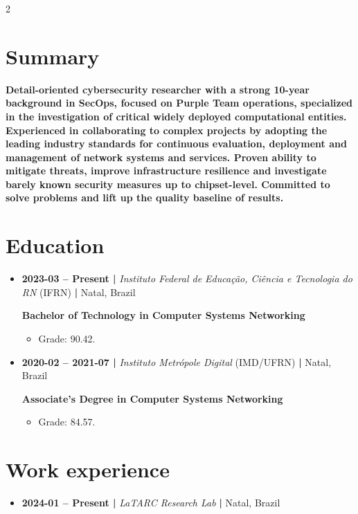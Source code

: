 \documentclass[a4paper,10pt]{article}
\begin{document}
\setlength{\columnsep}{6.35mm}
\setlength{\columnseprule}{1pt}
\def\columnseprulecolor{\color{x-acs-dark-red}}
\begin{multicols*}{2}
\section*{\textbf{Summary}}
\label{sec:orga3d499d}
\textbf{Detail-oriented cybersecurity researcher with a strong 10-year background in
SecOps, focused on Purple Team operations, specialized in the investigation of
critical widely deployed computational entities. Experienced in collaborating to
complex projects by adopting the leading industry standards for continuous
evaluation, deployment and management of network systems and services. Proven
ability to mitigate threats, improve infrastructure resilience and investigate
barely known security measures up to chipset-level. Committed to solve problems
and lift up the quality baseline of results.}
\section*{Education}
\label{sec:org8a8e533}
\begin{itemize}
\item \textbf{2023-03 -- Present |} \emph{Instituto Federal de Educação, Ciência e Tecnologia do
RN} (IFRN) \textbf{|} Natal, Brazil

\textbf{Bachelor of Technology in Computer Systems Networking}
\begin{itemize}
\item Grade: 90.42.
\end{itemize}

\item \textbf{2020-02 -- 2021-07 |} \emph{Instituto Metrópole Digital} (IMD/UFRN) \textbf{|} Natal,
Brazil

\textbf{Associate's Degree in Computer Systems Networking}
\begin{itemize}
\item Grade: 84.57.
\end{itemize}
\end{itemize}
\section*{Work experience}
\label{sec:orgf28ff4e}
\begin{itemize}
\item \textbf{2024-01 -- Present |} \emph{LaTARC Research Lab} \textbf{|} Natal, Brazil


\end{itemize}
\end{multicols*}
\end{document}
